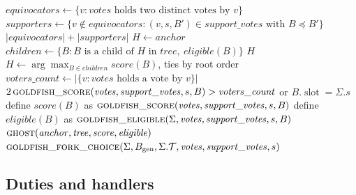 \documentclass{article}
\theoremstyle{plain}
\theoremstyle{definition}
\theoremstyle{remark}
\newcommand{\genesis}{B_{\mathrm{gen}}}
\newcommand{\slot}{\operatorname{slot}}
\newcommand{\T}{\mathcal T}
\begin{document}
\label{alg:goldfish}
\nopagebreak
{\footnotesize
\begin{algorithmic}[1]
  \State $\mathit{equivocators}\gets\{v:
    \mathit{votes}\text{ holds two distinct votes by }v\}$
  \State $\mathit{supporters}\gets
    \{v\notin\mathit{equivocators}:
    (v,s,B')\in\mathit{support\_votes}\text{ with }B\preceq B'\}$
  \State \Return $|\mathit{equivocators}|+|\mathit{supporters}|$
\EndFunction
\vspace{1pt}
  \State $H\gets\mathit{anchor}$
  \Loop
    \State $\mathit{children}\gets\{B:B\text{ is a child of }H\text{ in }
      \mathit{tree},\ \mathit{eligible}(B)\}$
     \State \Return $H$ \EndIf
    \State $H\gets\arg\max_{B\in\mathit{children}}\mathit{score}(B)$,
      ties by root order
  \EndLoop
\EndFunction
\vspace{1pt}
  \State $\mathit{voters\_count}\gets
    |\{v:\mathit{votes}\text{ holds a vote by }v\}|$
  \State \Return $2\,\Call{goldfish\_score}{\mathit{votes},
    \mathit{support\_votes},s,B}
    >\mathit{voters\_count}$ or $B.\slot=\Sigma.s$
\EndFunction
\vspace{1pt}
  \State define $\mathit{score}(B)$ as
  \Statex \hspace{2em}
    $\Call{goldfish\_score}{\mathit{votes},\mathit{support\_votes},s,B}$
  \State define $\mathit{eligible}(B)$ as
  \Statex \hspace{2em}
    $\Call{goldfish\_eligible}{\Sigma,\mathit{votes},
      \mathit{support\_votes},s,B}$
  \State \Return $\Call{ghost}{\mathit{anchor},\mathit{tree},
    \mathit{score},\mathit{eligible}}$
\EndFunction
\vspace{1pt}
  \State \Return $\Call{goldfish\_fork\_choice}{\Sigma,\genesis,\Sigma.\T,
    \mathit{votes},\mathit{support\_votes},s}$
\EndFunction
\end{algorithmic}
}

\subsection{Duties and handlers}\label{sec:goldfish-handlers}
\end{document}
